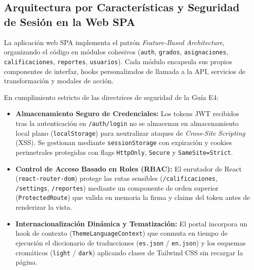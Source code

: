 \documentclass[11pt,a4paper]{article}
\begin{document}

\subsection{Arquitectura por Caracter\'isticas y Seguridad de Sesi\'on en la Web SPA}
La aplicaci\'on web SPA implementa el patr\'on \textit{Feature-Based Architecture}, organizando el c\'odigo en m\'odulos cohesivos (\texttt{auth}, \texttt{grados}, \texttt{asignaciones}, \texttt{calificaciones}, \texttt{reportes}, \texttt{usuarios}). Cada m\'odulo encapsula sus propios componentes de interfaz, hooks personalizados de llamada a la API, servicios de transformaci\'on y modales de acci\'on.

En cumplimiento estricto de las directrices de seguridad de la Gu\'ia E4:
\begin{itemize}
  \item \textbf{Almacenamiento Seguro de Credenciales:} Los tokens JWT recibidos tras la autenticaci\'on en \texttt{/auth/login} no se almacenan en almacenamiento local plano (\texttt{localStorage}) para neutralizar ataques de \textit{Cross-Site Scripting} (XSS). Se gestionan mediante \texttt{sessionStorage} con expiraci\'on y cookies perimetrales protegidas con flags \texttt{HttpOnly}, \texttt{Secure} y \texttt{SameSite=Strict}.
  \item \textbf{Control de Acceso Basado en Roles (RBAC):} El enrutador de React (\texttt{react-router-dom}) protege las rutas sensibles (\texttt{/calificaciones}, \texttt{/settings}, \texttt{/reportes}) mediante un componente de orden superior (\texttt{ProtectedRoute}) que valida en memoria la firma y claims del token antes de renderizar la vista.
  \item \textbf{Internacionalizaci\'on Din\'amica y Tematizaci\'on:} El portal incorpora un hook de contexto (\texttt{ThemeLanguageContext}) que conmuta en tiempo de ejecuci\'on el diccionario de traducciones (\texttt{es.json} / \texttt{en.json}) y los esquemas crom\'aticos (\texttt{light} / \texttt{dark}) aplicando clases de Tailwind CSS sin recargar la p\'agina.
\end{itemize}
\end{document}
